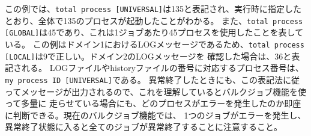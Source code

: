 この例では、\verb|total process [UNIVERSAL]|は135と表記され、実行時に指定したとおり、全体で135のプロセスが起動したことがわかる。
また、\verb|total process [GLOBAL]|は45であり、これは1ジョブあたり45プロセスを使用したことを表している。
この例はドメイン1におけるLOGメッセージであるため、\verb|total process [LOCAL]|は9で正しい。ドメイン2のLOGメッセージを
確認した場合は、36と表記される。
LOGファイルやhistoryファイルの番号に対応するプロセス番号は、\verb|my process ID [UNIVERSAL]|である。
異常終了したときにも、この表記法に従ってメッセージが出力されるので、これを理解しているとバルクジョブ機能を使って多量に
走らせている場合にも、どのプロセスがエラーを発生したのか即座に判断できる。現在のバルクジョブ機能では、
1つのジョブがエラーを発生し、異常終了状態に入ると全てのジョブが異常終了することに注意すること。



